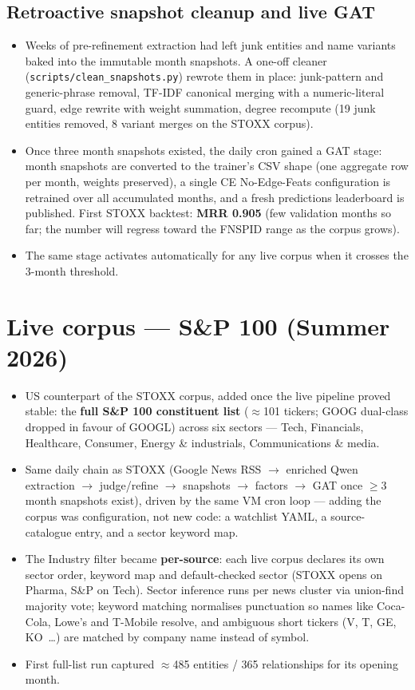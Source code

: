 \documentclass[11pt]{article}
\begin{document}
\subsection{Retroactive snapshot cleanup and live GAT}
\begin{itemize}
  \item Weeks of pre-refinement extraction had left junk entities and name variants baked into the immutable month snapshots. A one-off cleaner (\texttt{scripts/clean\_snapshots.py}) rewrote them in place: junk-pattern and generic-phrase removal, TF-IDF canonical merging with a numeric-literal guard, edge rewrite with weight summation, degree recompute (19 junk entities removed, 8 variant merges on the STOXX corpus).
  \item Once three month snapshots existed, the daily cron gained a GAT stage: month snapshots are converted to the trainer's CSV shape (one aggregate row per month, weights preserved), a single CE No-Edge-Feats configuration is retrained over all accumulated months, and a fresh predictions leaderboard is published. First STOXX backtest: \textbf{MRR 0.905} (few validation months so far; the number will regress toward the FNSPID range as the corpus grows).
  \item The same stage activates automatically for any live corpus when it crosses the 3-month threshold.
\end{itemize}

\section{Live corpus --- S\&P 100 (Summer 2026)}
\label{sec:sp100}

\begin{itemize}
  \item US counterpart of the STOXX corpus, added once the live pipeline proved stable: the \textbf{full S\&P 100 constituent list} (\(\approx\)101 tickers; GOOG dual-class dropped in favour of GOOGL) across six sectors --- Tech, Financials, Healthcare, Consumer, Energy \& industrials, Communications \& media.
  \item Same daily chain as STOXX (Google News RSS \(\to\) enriched Qwen extraction \(\to\) judge/refine \(\to\) snapshots \(\to\) factors \(\to\) GAT once \(\ge\)3 month snapshots exist), driven by the same VM cron loop --- adding the corpus was configuration, not new code: a watchlist YAML, a source-catalogue entry, and a sector keyword map.
  \item The Industry filter became \textbf{per-source}: each live corpus declares its own sector order, keyword map and default-checked sector (STOXX opens on Pharma, S\&P on Tech). Sector inference runs per news cluster via union-find majority vote; keyword matching normalises punctuation so names like Coca-Cola, Lowe's and T-Mobile resolve, and ambiguous short tickers (V, T, GE, KO~\ldots) are matched by company name instead of symbol.
  \item First full-list run captured \(\approx\)485 entities / 365 relationships for its opening month.
\end{itemize}
\end{document}
